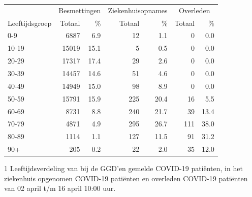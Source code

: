 \documentclass[
  english,
  man,floatsintext]{apa6}
\begin{document}
\begin{table}
\centering\begingroup\fontsize{11}{13}\selectfont

\begin{threeparttable}
\begin{tabular}{lrrrrrr}
\toprule
\multicolumn{1}{c}{ } & \multicolumn{2}{c}{Besmettingen} & \multicolumn{2}{c}{Ziekenhuisopnames} & \multicolumn{2}{c}{Overleden} \\
\cmidrule(l{3pt}r{3pt}){2-3} \cmidrule(l{3pt}r{3pt}){4-5} \cmidrule(l{3pt}r{3pt}){6-7}
Leeftijdsgroep & Totaal & \% & Totaal & \% & Totaal & \%\\
\midrule
0-9 & 6887 & 6.9 & 12 & 1.1 & 0 & 0.0\\
10-19 & 15019 & 15.1 & 5 & 0.5 & 0 & 0.0\\
20-29 & 17317 & 17.4 & 29 & 2.6 & 0 & 0.0\\
30-39 & 14457 & 14.6 & 51 & 4.6 & 0 & 0.0\\
40-49 & 14949 & 15.0 & 98 & 8.9 & 0 & 0.0\\
50-59 & 15791 & 15.9 & 225 & 20.4 & 16 & 5.5\\
60-69 & 8731 & 8.8 & 240 & 21.7 & 39 & 13.4\\
70-79 & 4871 & 4.9 & 295 & 26.7 & 111 & 38.0\\
80-89 & 1114 & 1.1 & 127 & 11.5 & 91 & 31.2\\
90+ & 205 & 0.2 & 22 & 2.0 & 35 & 12.0\\
\bottomrule
\end{tabular}
\begin{tablenotes}
\item[1] Leeftijdsverdeling van bij de GGD’en gemelde COVID-19 patiënten, in het ziekenhuis opgenomen COVID-19 patiënten en overleden COVID-19 patiënten van 02 april t/m 16 april 10:00 uur.
\end{tablenotes}
\end{threeparttable}
\endgroup{}
\end{table}

\newpage
\end{document}
